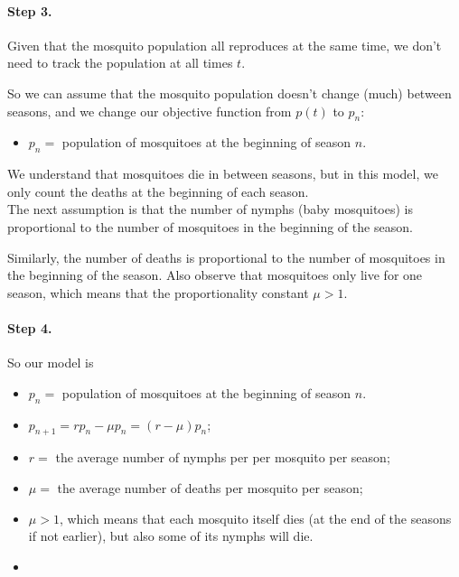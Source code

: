\begin{example}
\paragraph{Step 3.} Given that the mosquito population all reproduces at the same time, we don't need to track the population at all times $t$.

So we can assume that the mosquito population doesn't change (much) between seasons, and we change our objective function from $p(t)$ to $p_n$:
\begin{itemize}
	\item $p_n = $ population of mosquitoes at the beginning of season $n$.
\end{itemize}

We understand that mosquitoes die in between seasons, but in this model, we only count the deaths at the beginning of each season. \\

The next assumption is that the number of nymphs (baby mosquitoes) is proportional to the number of mosquitoes in the beginning of the season.

Similarly, the number of deaths is proportional to the number of mosquitoes in the beginning of the season. Also observe that mosquitoes only live for one season, which means that the proportionality constant $\mu > 1$.



\paragraph{Step 4.} So our model is
\begin{itemize}
	\item $p_n = $ population of mosquitoes at the beginning of season $n$.
	\item $p_{n+1} = r p_n - \mu p_n = (r-\mu)p_n$;
	\item $r = $ the average number of nymphs per per mosquito per season;
	\item $\mu = $ the average number of deaths per mosquito per season;
	\item $\mu > 1$, which means that each mosquito itself dies (at the end of the seasons if not earlier), but also some of its nymphs will die.
\end{itemize}

\end{example}

\begin{video}
\begin{itemize}
	\item {}
\end{itemize}	
\end{video}

